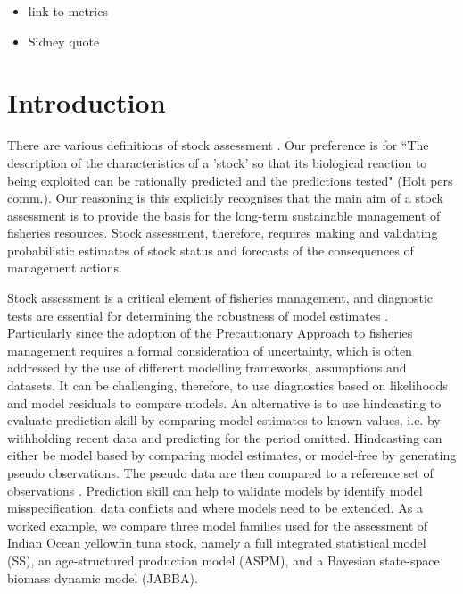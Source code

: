 \documentclass[12pt,halfline,a4paper,nonumbib]{ouparticle}
\begin{document}
\date{\today}


\maketitle



\begin{itemize}
\item link to metrics
\item Sidney quote
\end{itemize}

\section{Introduction}

There are various definitions of stock assessment \parencite[e.g.][]{hilborn2003state,cadrin2014stock}. Our preference is for ``The description of the characteristics of a 'stock' so that its biological reaction to being exploited can be rationally predicted and the predictions tested" (Holt pers comm.). Our reasoning is this explicitly recognises that the main aim of a stock assessment is to provide the basis for the long-term sustainable management of fisheries resources. Stock assessment, therefore, requires making and validating probabilistic estimates of stock status and forecasts of the consequences of management actions.

Stock assessment is a critical element of fisheries management, and diagnostic tests are essential for determining the robustness of model estimates \parencite{carvalho2020cookbook}. Particularly since the adoption of the Precautionary Approach to fisheries management \parencite[PA,][]{garcia1996precautionary} requires a formal consideration of uncertainty, which is often addressed by the use of different modelling frameworks, assumptions and datasets. It can be challenging, therefore, to use diagnostics based on likelihoods and model residuals to compare models. An alternative is to use hindcasting to evaluate prediction skill \parencite{huschke1959glossary} by comparing model estimates to known values, i.e. by withholding recent data and predicting for the period omitted. Hindcasting can either be model based by comparing model estimates, or model-free by generating pseudo observations. The pseudo data are then compared to a reference set of observations \parencite{jin2008current, weigel2008can, balmaseda1995decadal}. Prediction skill can help to validate models by identify model misspecification, data conflicts and where models need to be extended. As a worked example, we compare three model families used for the assessment of Indian Ocean yellowfin tuna stock, namely a full integrated statistical model (SS), an age-structured production model (ASPM), and a Bayesian state-space biomass dynamic model (JABBA). 
\end{document}

